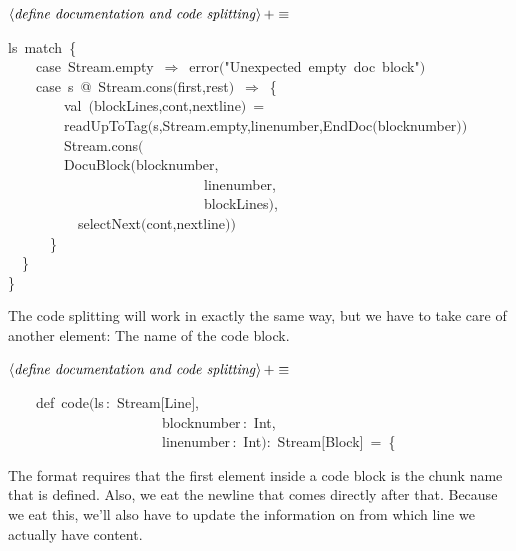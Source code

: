 \documentclass[a4paper,12pt]{article}
\begin{document}
$\left<\mbox{\emph{define documentation and code splitting}}\right>+\equiv$
\begin{program}ls~{\vem match}~{\small\{}
\\~~~~{\vem case}~Stream.empty~$\Rightarrow$~error$($"Unexpected~empty~doc~block"$)$
\\~~~~{\vem case}~s~@~Stream.cons$($first,rest$)$~$\Rightarrow$~{\small\{}
\\~~~~~~~~{\vem val}~$($blockLines,cont,nextline$)$~=
\\~~~~~~~~readUpToTag$($s,Stream.empty,linenumber,EndDoc$($blocknumber$)$$)$
\\~~~~~~~~Stream.cons$($
\\~~~~~~~~DocuBlock$($blocknumber,
\\~~~~~~~~~~~~~~~~~~~~~~~~~~~~linenumber,
\\~~~~~~~~~~~~~~~~~~~~~~~~~~~~blockLines$)$,
\\~~~~~~~~~~selectNext$($cont,nextline$)$$)$
\\~~~~~~{\small\}}
\\~~{\small\}}
\\{\small\}}
\\[0.5em]\end{program}
The code splitting will work in exactly the same way, but we have to
take care of another element: The name of the code block.

$\left<\mbox{\emph{define documentation and code splitting}}\right>+\equiv$
\begin{program}~~~~{\vem def}~code$($ls\,{\rm :}~Stream$[$Line$]$,
\\~~~~~~~~~~~~~~~~~~~~~~blocknumber\,{\rm :}~Int,
\\~~~~~~~~~~~~~~~~~~~~~~linenumber\,{\rm :}~Int$)${\rm :}~Stream$[$Block$]$~=~{\small\{}
\\[0.5em]\end{program}
The format requires that the first element inside a code block is
the chunk name that is defined. Also, we eat the newline that comes
directly after that. Because we eat this, we'll also have to update
the information on from which line we actually have content.
\end{document}
